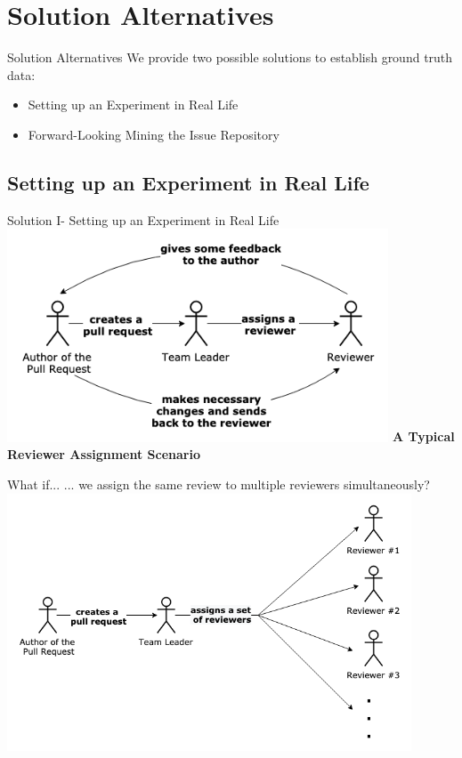 \documentclass{beamer}
\begin{document}
\section{Solution Alternatives}
    \begin{frame}{Solution Alternatives}
    We provide two possible solutions to establish ground truth data: \newline
    \begin{itemize}
        \item Setting up an Experiment in Real Life
        \item Forward-Looking Mining the Issue Repository
    \end{itemize}
    \end{frame}
    \iffalse
    \subsection{Setting up an Experiment in Real Life}
    \begin{frame}{Solution I- Setting up an Experiment in Real Life}
        \centering\includegraphics[width=0.85\textwidth]{img/normal_review.png} \newline
        \centering\color[rgb]{0,0.325,0.627}\textbf{A Typical Reviewer Assignment Scenario}
    \end{frame}

    \begin{frame}{What if...}
        ... we assign the same review to multiple reviewers simultaneously?
        \centering\includegraphics[width=0.9\textwidth]{img/multiple_review.png}
    \end{frame}
\end{document}

